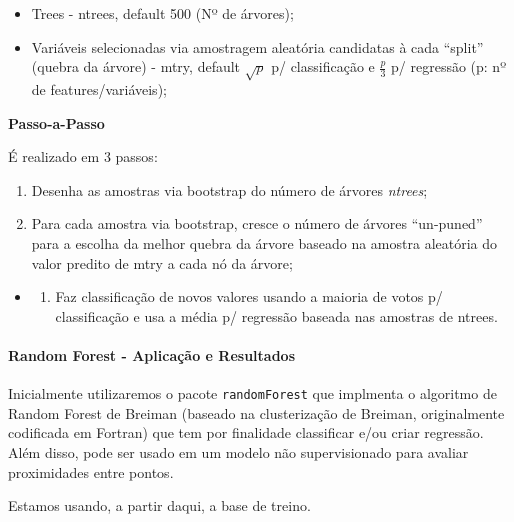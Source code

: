 \documentclass[]{article}
\providecommand{\tightlist}{%
  \setlength{\itemsep}{0pt}\setlength{\parskip}{0pt}}
\let\oldparagraph\paragraph
\renewcommand{\paragraph}[1]{\oldparagraph{#1}\mbox{}}
\begin{document}
\begin{itemize}
\tightlist
\item
  Trees - ntrees, default 500 (Nº de árvores);
\item
  Variáveis selecionadas via amostragem aleatória candidatas à cada
  ``split'' (quebra da árvore) - mtry, default \(\sqrt{p}\) p/
  classificação e \(\frac{p}{3}\) p/ regressão (p: nº de
  features/variáveis);
\end{itemize}

\textbf{Passo-a-Passo}

É realizado em 3 passos:

\begin{enumerate}
\def\labelenumi{\arabic{enumi}.}
\tightlist
\item
  Desenha as amostras via bootstrap do número de árvores
  \emph{ntrees};\\
\item
  Para cada amostra via bootstrap, cresce o número de árvores
  ``un-puned'' para a escolha da melhor quebra da árvore baseado na
  amostra aleatória do valor predito de mtry a cada nó da árvore;\\
\end{enumerate}

\begin{itemize}
\item
  \begin{enumerate}
  \def\labelenumi{\arabic{enumi}.}
  \setcounter{enumi}{2}
  \tightlist
  \item
    Faz classificação de novos valores usando a maioria de votos p/
    classificação e usa a média p/ regressão baseada nas amostras de
    ntrees.
  \end{enumerate}
\end{itemize}

\paragraph{Random Forest - Aplicação e
Resultados}\label{random-forest---aplicacao-e-resultados}

Inicialmente utilizaremos o pacote \texttt{randomForest} que implmenta o
algoritmo de Random Forest de Breiman (baseado na clusterização de
Breiman, originalmente codificada em Fortran) que tem por finalidade
classificar e/ou criar regressão. Além disso, pode ser usado em um
modelo não supervisionado para avaliar proximidades entre pontos.

Estamos usando, a partir daqui, a base de treino.
\end{document}
